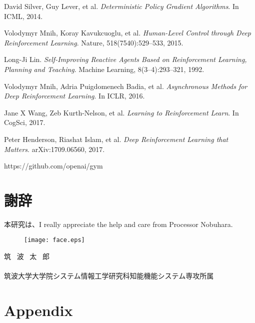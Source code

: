 \documentclass[11pt,twocolumn]{jarticle} %
\begin{document}
\begin{thebibliography}{9}
David Silver, Guy Lever, et al. \textsl{Deterministic Policy Gradient Algorithms}. In ICML, 2014.

Volodymyr Mnih, Koray Kavukcuoglu, et al. \textsl{Human-Level Control through Deep Reinforcement Learning}. Nature, 518(7540):529–533, 2015.

Long-Ji Lin. \textsl{Self-Improving Reactive Agents Based on Reinforcement Learning, Planning and Teaching}. Machine Learning, 8(3–4):293–321, 1992.

Volodymyr Mnih, Adria Puigdomenech Badia, et al. \textsl{Asynchronous Methods for Deep Reinforcement Learning}. In ICLR, 2016.

Jane X Wang, Zeb Kurth-Nelson, et al. \textsl{Learning to Reinforcement Learn}. In CogSci, 2017.

Peter Henderson, Riashat Islam, et al. \textsl{Deep Reinforcement Learning that Matters}. arXiv:1709.06560, 2017.

https://github.com/openai/gym

\section*{謝辞}
本研究は、I really appreciate the help and care from Processor Nobuhara.

\vspace{2zh}
\begin{minipage}{73mm}
 \begin{wrapfigure}[6]{l}[-4pt]{30mm} 
 \begin{center}
  \texttt{[image: face.eps]}
 \end{center}
 \end{wrapfigure}
 \noindent 筑 \ 波 \ 太 \  郎\\\\
 筑波大学大学院システム情報工学研究科知能機能システム専攻所属
\end{minipage}

\end{thebibliography}
\clearpage

\section{Appendix}
\end{document}
